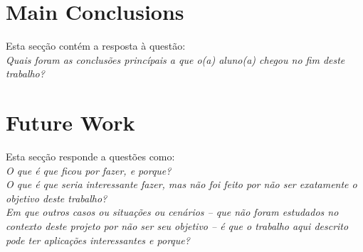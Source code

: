 \documentclass[titlepage,12pt,a4paper,times]{book}
\begin{document}
\section{Main Conclusions}
\label{sec:main-conc}

Esta secção contém a resposta à questão: \\
\emph{Quais foram as conclusões princípais a que o(a) aluno(a) chegou no fim
deste trabalho?}

\section{Future Work}
\label{sec:future-work}

Esta secção responde a questões como:\\
\emph{O que é que ficou por fazer, e porque?}\\
\emph{O que é que seria interessante fazer, mas não foi feito por não ser
exatamente o objetivo deste trabalho?}\\
\emph{Em que outros casos ou situações ou cenários -- que não foram estudados
no contexto deste projeto por não ser seu objetivo -- é que o trabalho aqui
descrito pode ter aplicações interessantes e porque?}

% 
% 
% 
% 

\backmatter



\end{document}
